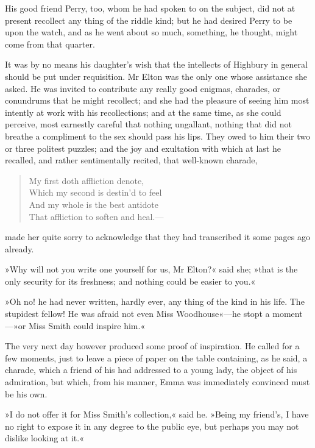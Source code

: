 His good friend Perry, too, whom he had spoken to on the subject, did not at present recollect any thing of the riddle kind; but he had desired Perry to be upon the watch, and as he went about so much, something, he thought, might come from that quarter.

It was by no means his daughter's wish that the intellects of Highbury in general should be put under requisition. Mr Elton was the only one whose assistance she asked. He was invited to contribute any really good enigmas, charades, or conundrums that he might recollect; and she had the pleasure of seeing him most intently at work with his recollections; and at the same time, as she could perceive, most earnestly careful that nothing ungallant, nothing that did not breathe a compliment to the sex should pass his lips. They owed to him their two or three politest puzzles; and the joy and exultation with which at last he recalled, and rather sentimentally recited, that well-known charade,

\begin{verse}
\begin{altverse}
My first doth affliction denote,\\
    Which my second is destin'd to feel\\
And my whole is the best antidote\\
    That affliction to soften and heal.—\\
\end{altverse}
\end{verse}

made her quite sorry to acknowledge that they had transcribed it some pages ago already.

»Why will not you write one yourself for us, Mr Elton?« said she; »that is the only security for its freshness; and nothing could be easier to you.«

»Oh no! he had never written, hardly ever, any thing of the kind in his life. The stupidest fellow! He was afraid not even Miss Woodhouse«—he stopt a moment—»or Miss Smith could inspire him.«

The very next day however produced some proof of inspiration. He called for a few moments, just to leave a piece of paper on the table containing, as he said, a charade, which a friend of his had addressed to a young lady, the object of his admiration, but which, from his manner, Emma was immediately convinced must be his own.

»I do not offer it for Miss Smith's collection,« said he. »Being my friend's, I have no right to expose it in any degree to the public eye, but perhaps you may not dislike looking at it.«


